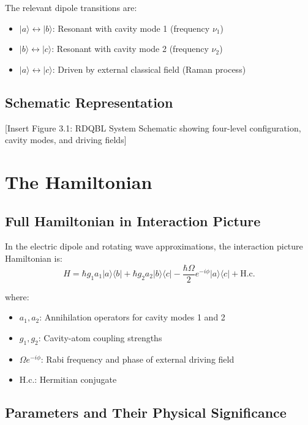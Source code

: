 The relevant dipole transitions are:
\begin{itemize}
	\item $|a\rangle \leftrightarrow |b\rangle$: Resonant with cavity mode 1 (frequency $\nu_1$)
	\item $|b\rangle \leftrightarrow |c\rangle$: Resonant with cavity mode 2 (frequency $\nu_2$)
	\item $|a\rangle \leftrightarrow |c\rangle$: Driven by external classical field (Raman process)
\end{itemize}

\subsection{Schematic Representation}

[Insert Figure 3.1: RDQBL System Schematic showing four-level configuration, cavity modes, and driving fields]

\section{The Hamiltonian}

\subsection{Full Hamiltonian in Interaction Picture}

In the electric dipole and rotating wave approximations, the interaction picture Hamiltonian is:
\begin{equation}
H = \hbar g_1 a_1 |a\rangle\langle b| + \hbar g_2 a_2 |b\rangle\langle c| - \frac{\hbar\Omega}{2}e^{-i\phi}|a\rangle\langle c| + \text{H.c.}
\end{equation}

where:
\begin{itemize}
	\item $a_1, a_2$: Annihilation operators for cavity modes 1 and 2
	\item $g_1, g_2$: Cavity-atom coupling strengths
	\item $\Omega e^{-i\phi}$: Rabi frequency and phase of external driving field
	\item H.c.: Hermitian conjugate
\end{itemize}

\subsection{Parameters and Their Physical Significance}

